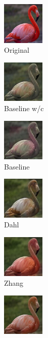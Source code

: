 \begin{figure}[t]
	\vspace{0.1cm}
	\begin{subfigure}[b]{0.1\textwidth}
		\centering
		\includegraphics[width=2cm]{or - flamingo.jpg}
		\caption{Original}
	\end{subfigure}
	\hfill
	\begin{subfigure}[b]{0.1\textwidth}
		\includegraphics[width=2cm]{bw - flamingo.jpg}
		\caption{Baseline w/c}
	\end{subfigure}
	\hfill
	\begin{subfigure}[b]{0.1\textwidth}
		\includegraphics[width=2cm]{b - flamingo.jpg}
		\caption{Baseline}
	\end{subfigure}
	\hfill
	\begin{subfigure}[b]{0.1\textwidth}
		\includegraphics[width=2cm]{d - flamingo.jpg}
		\caption{Dahl}
	\end{subfigure}
	\hfill
	\begin{subfigure}[b]{0.1\textwidth}
		\includegraphics[width=2cm]{z - flamingo.jpg}
		\caption{Zhang}
	\end{subfigure}
	\hfill
	\begin{subfigure}[b]{0.1\textwidth}
		\includegraphics[width=2cm]{si- flamingo.jpg}

\end{subfigure}
\end{figure}
